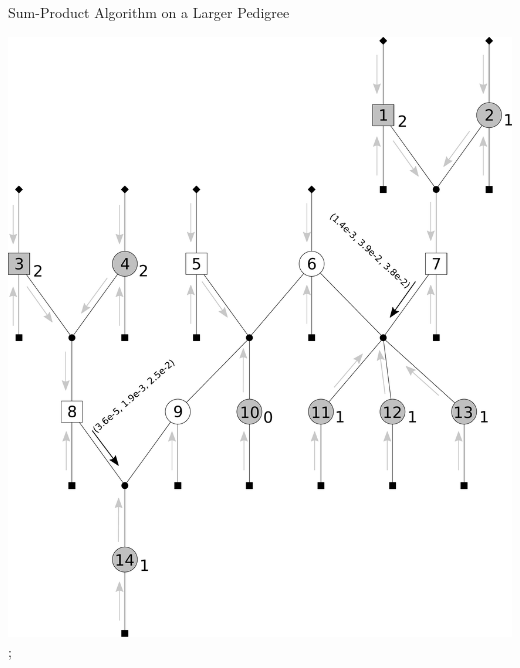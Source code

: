 \documentclass[letter,graphicx]{beamer}
\begin{document}
\begin{frame}{Sum-Product Algorithm on a Larger Pedigree} 
\begin{center} 
\includegraphics[height = 0.8\textheight]{./images/mg-example-step4.pdf}; 
\end{center}
\end{frame}
\end{document}
